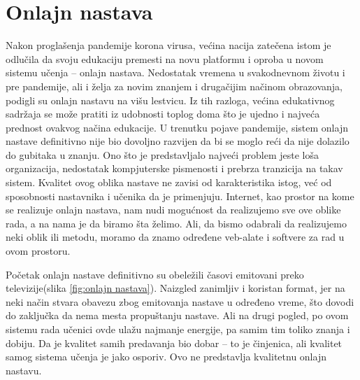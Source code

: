 \documentclass[a4paper]{article}
\begin{document}
\section{Onlajn nastava}
\label{sec:Onlajn}
Nakon proglašenja pandemije korona virusa, većina nacija zatečena istom je odlučila da svoju edukaciju premesti na novu platformu i oproba u novom sistemu učenja – onlajn nastava. Nedostatak vremena u svakodnevnom životu i pre pandemije, ali i želja za novim znanjem i drugačijim načinom obrazovanja, podigli su onlajn nastavu na višu lestvicu. Iz tih razloga, većina edukativnog sadržaja se može pratiti iz udobnosti toplog doma što je ujedno i najveća prednost ovakvog načina edukacije. U trenutku pojave pandemije, sistem onlajn nastave definitivno nije bio dovoljno razvijen da bi se moglo reći da nije dolazilo do gubitaka u znanju. Ono što je predstavljalo najveći problem jeste loša organizacija, nedostatak kompjuterske pismenosti i prebrza tranzicija na takav sistem. Kvalitet ovog oblika nastave ne zavisi od karakteristika istog, već od sposobnosti nastavnika i učenika da je primenjuju. Internet, kao prostor na kome se realizuje onlajn nastava, nam nudi mogućnost da realizujemo sve ove oblike rada, a na nama je da biramo šta želimo. Ali, da bismo odabrali da realizujemo neki oblik ili metodu, moramo da znamo određene veb-alate i softvere za rad u ovom prostoru. 

Početak onlajn nastave definitivno su obeležili časovi emitovani preko televizije(slika \ref{fig:onlajn nastava}). Naizgled zanimljiv i koristan format, jer na neki način stvara obavezu zbog emitovanja nastave u određeno vreme, što dovodi do zaključka da nema mesta propuštanju nastave. Ali na drugi pogled, po ovom sistemu rada učenici ovde ulažu najmanje energije, pa samim tim toliko znanja i dobiju. Da je kvalitet samih predavanja bio dobar – to je činjenica, ali kvalitet samog sistema učenja je jako osporiv. Ovo ne predstavlja kvalitetnu onlajn nastavu.\cite{referenca5}
\end{document}
